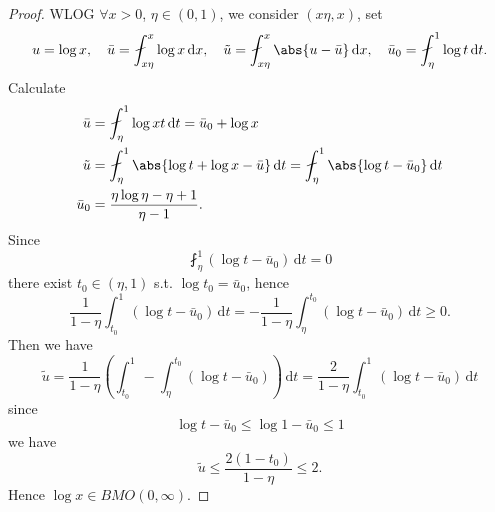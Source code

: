 \documentclass[a4paper]{article}
\newcommand\diff{\,\mathrm{d}}
\DeclarePairedDelimiter{\abs}\lvert\rvert
\begin{document}
\begin{proof}
WLOG $\forall x > 0$, $\eta \in (0,1)$, we consider $(x\eta, x)$, set
\begin{equation*}
u = \log{x}, \quad \bar{u} = \fint_{x\eta}^x \log{x} \diff x, \quad \tilde{u} = \fint_{x\eta}^x \abs{u - \bar{u}} \diff x, 
\quad \bar{u}_0 = \fint_{\eta}^1 \log{t} \diff t.
\end{equation*}
Calculate
\begin{align*}
\bar{u} &= \fint_{\eta}^1 \log{xt} \diff t = \bar{u}_0 + \log{x} \\
\tilde{u} &= \fint_{\eta}^1 \abs{\log{t} + \log{x} - \bar{u}} \diff t = \fint_{\eta}^1 \abs{\log{t} - \bar{u}_0} \diff t \\
\bar{u}_0 &= \frac{\eta \log{\eta} - \eta + 1}{\eta - 1}.
\end{align*}
Since
\begin{equation*}
\fint_{\eta}^1 (\log{t} - \bar{u}_0) \diff t = 0
\end{equation*}
there exist $t_0 \in (\eta, 1)$ s.t. $\log{t_0} = \bar{u}_0$, hence
\begin{equation*}
\frac{1}{1 - \eta}\int_{t_0}^1 (\log{t} - \bar{u}_0) \diff t 
= -\frac{1}{1 - \eta}\int^{t_0}_{\eta} (\log{t} - \bar{u}_0) \diff t \geq 0.
\end{equation*}
Then we have
\begin{equation*}
\tilde{u} = \frac{1}{1- \eta}\left( \int_{t_0}^1 - \int_{\eta}^{t_0} (\log{t} - \bar{u}_0) \right) \diff t 
= \frac{2}{1-\eta}\int_{t_0}^1 (\log{t} - \bar{u}_0) \diff t
\end{equation*}
since
\begin{equation*}
\log{t} - \bar{u}_0 \leq \log{1} - \bar{u}_0 \leq 1
\end{equation*}
we have
\begin{equation*}
\tilde{u} \leq \frac{2(1-t_0)}{1-\eta} \leq 2.
\end{equation*}
Hence $\log{x} \in BMO(0,\infty)$.
\end{proof}
\end{document}
